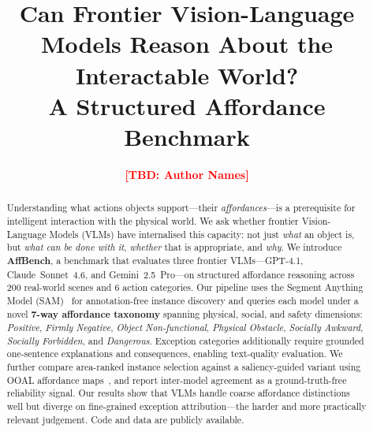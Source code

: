 \documentclass[runningheads]{llncs}
\newcommand{\TBD}[1]{\textcolor{red}{\textbf{[TBD: #1]}}}
\newcommand{\numimages}{200}      %
\newcommand{\numactions}{6}
\begin{document}
\title{Can Frontier Vision-Language Models Reason About the Interactable World?\\
A Structured Affordance Benchmark}


\author{
  \TBD{Author Names}
}
\authorrunning{\TBD{Author et al.}}
\institute{\TBD{Institution}}

\maketitle

\begin{abstract}
Understanding what actions objects support—their \emph{affordances}—is a
prerequisite for intelligent interaction with the physical world. We ask
whether frontier Vision-Language Models (VLMs) have internalised this
capacity: not just \emph{what} an object is, but \emph{what can be done
with it}, \emph{whether} that is appropriate, and \emph{why}. We
introduce \textbf{AffBench}, a benchmark that evaluates three frontier
VLMs—GPT-4.1, Claude~Sonnet~4.6, and Gemini~2.5~Pro—on structured
affordance reasoning across \numimages{} real-world scenes and
\numactions{} action categories. Our pipeline uses the Segment Anything
Model (SAM)~\cite{kirillov2023sam} for annotation-free instance discovery
and queries each model under a novel \textbf{7-way affordance taxonomy}
spanning physical, social, and safety dimensions: \emph{Positive},
\emph{Firmly Negative}, \emph{Object Non-functional}, \emph{Physical
Obstacle}, \emph{Socially Awkward}, \emph{Socially Forbidden}, and
\emph{Dangerous}. Exception categories additionally require grounded
one-sentence explanations and consequences, enabling text-quality
evaluation. We further compare area-ranked instance selection against a
saliency-guided variant using OOAL affordance maps~\cite{ooal}, and
report inter-model agreement as a ground-truth-free reliability signal.
Our results show that VLMs handle coarse affordance distinctions well
but diverge on fine-grained exception attribution—the harder and more
practically relevant judgement. Code and data are publicly available.
\end{abstract}



\end{document}
